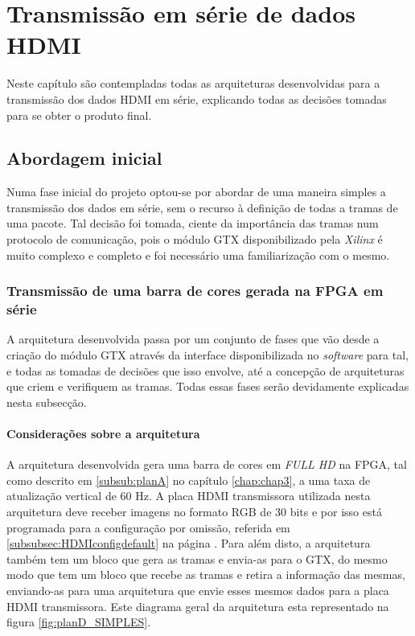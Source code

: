 \chapter{Transmissão em série de dados HDMI} \label{chap:chap5}

Neste capítulo são contempladas todas as arquiteturas desenvolvidas para a transmissão dos dados HDMI em série, explicando todas as decisões tomadas para se obter o produto final. 

\section{Abordagem inicial}

Numa fase inicial do projeto optou-se por abordar de uma maneira simples a transmissão dos dados em série, sem o recurso à definição de todas a tramas de uma pacote. Tal decisão foi tomada, ciente da importância das tramas num protocolo de comunicação, pois o módulo GTX disponibilizado pela \textit{Xilinx} é muito complexo e completo e foi necessário uma familiarização com o mesmo.

\subsection{Transmissão de uma barra de cores gerada na FPGA em série} \label{sub:planD}

A arquitetura desenvolvida passa por um conjunto de fases que vão desde a criação do módulo GTX através da interface disponibilizada no \textit{software} para tal, e todas as tomadas de decisões que isso envolve, até a concepção de arquiteturas que criem e verifiquem as tramas. Todas essas fases serão devidamente explicadas nesta subsecção.

\subsubsection*{Considerações sobre a arquitetura} \label{subsub:planD_considerações}

A arquitetura desenvolvida gera uma barra de cores em \textit{FULL HD} na FPGA, tal como descrito em \ref{subsub:planA} no capítulo \ref{chap:chap3}, a uma taxa de atualização vertical de 60 Hz. A placa HDMI transmissora utilizada nesta arquitetura deve receber imagens no formato RGB de 30 bits e por isso está programada para a configuração por omissão, referida em \ref{subsubsec:HDMIconfigdefault} na página \pageref{subsubsec:HDMIconfigdefault}. Para além disto, a arquitetura também tem um bloco que gera as tramas e envia-as para o GTX, do mesmo modo que tem um bloco que recebe as tramas e retira a informação das mesmas, enviando-as para uma arquitetura que envie esses mesmos dados para a placa HDMI transmissora. Este diagrama geral da arquitetura esta representado na figura \ref{fig:planD_SIMPLES}.

